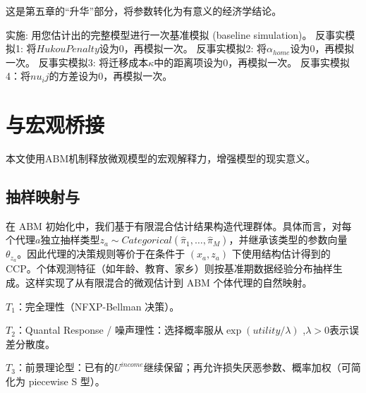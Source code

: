 \documentclass[
  a4paper,
  zihao=-4,
  fontset=mac,
  AutoFakeBold,
  AutoFakeSlant,
  oneside]{ctexbook}
\begin{document}
这是第五章的“升华”部分，将参数转化为有意义的经济学结论。





实施:
用您估计出的完整模型进行一次基准模拟 (baseline simulation)。
反事实模拟1: 将$HukouPenalty$设为$0$，再模拟一次。
反事实模拟2: 将$\alpha_{home}$设为$0$，再模拟一次。
反事实模拟3: 将迁移成本$\kappa$中的距离项设为$0$，再模拟一次。
反事实模拟4：将$nu_ij$的方差设为0，再模拟一次。


\chapter{与宏观桥接} %
\label{sec:与宏观桥接}

本文使用ABM机制释放微观模型的宏观解释力，增强模型的现实意义。


\section{抽样映射与} %
\label{sub:抽样映射与}


在 ABM 初始化中，我们基于有限混合估计结果构造代理群体。具体而言，对每个代理$a$独立抽样类型$z_a\sim Categorical(\hat \pi_1,\dots,\hat \pi_M)$，并继承该类型的参数向量 $\theta_{z_a}$。因此代理的决策规则等价于在条件于 $(x_a,z_a)$ 下使用结构估计得到的 CCP。个体观测特征（如年龄、教育、家乡）则按基准期数据经验分布抽样生成。这样实现了从有限混合的微观估计到 ABM 个体代理的自然映射。


$𝑇_1$：完全理性（NFXP-Bellman 决策）。

$𝑇_2$：Quantal Response / 噪声理性：选择概率服从$\exp(utility/\lambda)$ ,$\lambda>0$表示误差分散度。

$𝑇_3$：前景理论型：已有的$U^{income}$继续保留；再允许损失厌恶参数、概率加权（可简化为 piecewise S 型）。
\end{document}
